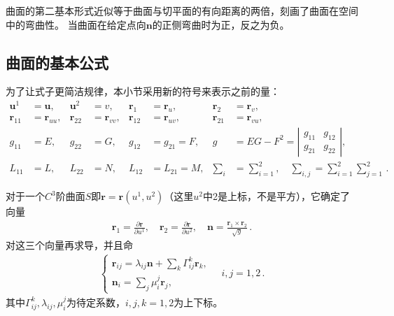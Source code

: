 曲面的第二基本形式近似等于曲面与切平面的有向距离的两倍，刻画了曲面在空间中的弯曲性。
当曲面在给定点向$\bm n$的正侧弯曲时为正，反之为负。

\subsection{曲面的基本公式}\label{sub:曲面的基本公式}
\begin{notation}
    为了让式子更简洁规律，本小节采用新的符号来表示之前的量：
    \begin{align*}%
        \bm u^1    & =\bm u,      & \bm u^2    & =v,          & \bm r_1    & =\bm r_u,    & \bm r_2         & =\bm r_v,                                                                                       \\
        \bm r_{11} & =\bm r_{uu}, & \bm r_{22} & =\bm r_{vv}, & \bm r_{12} & =\bm r_{uv}, & \bm r_{21}      & =\bm r_{vu},                                                                                    \\
        g_{11}     & =E,          & g_{22}     & =G,          & g_{12}     & =g_{21}=F,   & g               & =EG-F^2=\left|\begin{array}{cc}g_{11}&g_{12}\\ g_{21}&g_{22}\end{array}\right|,                                                \\
        L_{11}     & =L,          & L_{22}     & =N,          & L_{12}     & =L_{21}=M,   & \sum\limits_{i} & =\sum\limits_{i=1}^{2},\quad \sum\limits_{i,j}=\sum\limits_{i=1}^{2}{\sum\limits_{j=1}^{2}}\, .
    \end{align*}
\end{notation}

对于一个$C^3$阶曲面$S$即$\bm r=\bm r(u^1,u^2)$（这里$u^2$中2是上标，不是平方），它确定了向量
\begin{align}\label{eq:03ex01.26}
    \bm r_1=\frac{\partial \bm r}{\partial u^1}, \quad \bm r_2=\frac{\partial \bm r}{\partial u^2}, \quad \bm n=\frac{\bm r_1\times\bm r_2}{\sqrt{g}}\, .
\end{align}
对这三个向量再求导，并且命
\begin{align}\label{eq:03ex01.27}
    \left\{\begin{array}{l}
        \displaystyle\bm r_{ij}=\lambda_{ij}\bm n+\sum\limits_{k}{\varGamma_{ij}^k\bm r_k}, \\
        \displaystyle\bm n_i=\sum\limits_{j}{\mu_i^j\bm r_j},
    \end{array}\right.\quad i,j=1,2\, .
\end{align}
其中$\varGamma_{ij}^k,\lambda_{ij},\mu_i^j$为待定系数，$i,j,k=1,2$为上下标。

